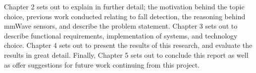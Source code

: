 Chapter 2 sets out to explain in further detail; the motivation behind the topic choice, previous work conducted relating to fall detection, the reasoning behind mmWave sensors, and describe the problem statement. 
Chapter 3 sets out to describe functional requirements, implementation of systems, and technology choice.
Chapter 4 sets out to present the results of this research, and evaluate the results in great detail. Finally, Chapter 5 sets out to conclude this report as well as offer suggestions for future work continuing from this project. 

